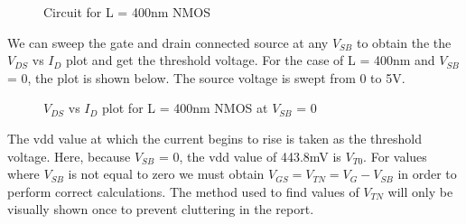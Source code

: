\documentclass[12pt]{article}
\begin{document}
\begin{figure} [H]
    \centering
    \caption{Circuit for L = 400nm NMOS}
\end{figure}
We can sweep the gate and drain connected source at any $V_{SB}$ to obtain the the $V_{DS}$ vs $I_{D}$ plot and get the threshold voltage. For the case of 
L = 400nm and $V_{SB}$ = 0, the plot is shown below. The source voltage is swept from 0 to 5V.
\begin{figure} [H]
    \centering
    \caption{$V_{DS}$ vs $I_{D}$ plot for L = 400nm NMOS at $V_{SB}$ = 0}
\end{figure}
The vdd value at which the current begins to rise is taken as the threshold voltage. Here, because $V_{SB}$ = 0, the vdd value of 443.8mV is $V_{T0}$. For 
values where $V_{SB}$ is not equal to zero we must obtain $V_{GS} = V_{TN} = V_G - V_{SB}$ in order to perform correct calculations.
The method used to find values of $V_{TN}$ will only be visually shown once to prevent cluttering in the report. 
\end{document}
